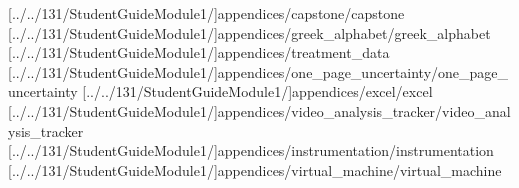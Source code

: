 \documentclass[english,twoside]{article}
\begin{document}
\startappendix

[../../131/StudentGuideModule1/]{appendices/capstone/capstone}
\newcommand{\GreekLettersUsed}{alpha, beta, gamma, delta, Delta, epsilon, eta, theta, kappa, lambda, mu, pi, rho, Sigma, sigma, tau, Phi, phi, Omega, omega}
[../../131/StudentGuideModule1/]{appendices/greek_alphabet/greek_alphabet}
[../../131/StudentGuideModule1/]{appendices/treatment_data}
[../../131/StudentGuideModule1/]{appendices/one_page_uncertainty/one_page_uncertainty}
[../../131/StudentGuideModule1/]{appendices/excel/excel}
[../../131/StudentGuideModule1/]{appendices/video_analysis_tracker/video_analysis_tracker}
[../../131/StudentGuideModule1/]{appendices/instrumentation/instrumentation}
[../../131/StudentGuideModule1/]{appendices/virtual_machine/virtual_machine}

\startinstructornotes
\end{document}
